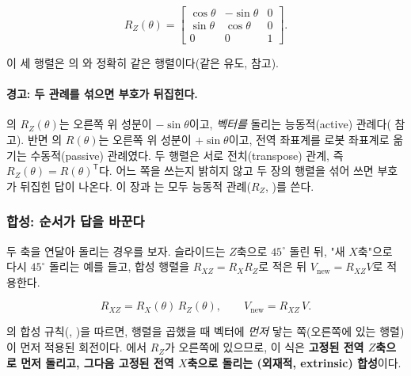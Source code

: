 \begin{equation}
\label{eq:lec02-rz}
R_Z(\theta) =
\begin{bmatrix}
\cos\theta & -\sin\theta & 0 \\
\sin\theta & \cos\theta & 0 \\
0 & 0 & 1
\end{bmatrix}.
\end{equation}

이 세 행렬은 의 와 정확히
같은 행렬이다(같은 유도,  참고).

\paragraph{경고: 두 관례를 섞으면 부호가 뒤집힌다.}
의 $R_Z(\theta)$는 오른쪽 위 성분이 $-\sin\theta$이고,
\emph{벡터를} 돌리는 능동적(active) 관례다( 참고).
반면 의 $R(\theta)$는 오른쪽 위 성분이 $+\sin\theta$이고, 전역
좌표계를 로봇 좌표계로 옮기는 수동적(passive) 관례였다. 두 행렬은 서로
전치(transpose) 관계, 즉 $R_Z(\theta) = R(\theta)^{\mathsf{T}}$다. 어느 쪽을
쓰는지 밝히지 않고 두 장의 행렬을 섞어 쓰면 부호가 뒤집힌 답이 나온다. 이
장과 는 모두 능동적 관례($R_Z$, )를 쓴다.

\subsubsection{합성: 순서가 답을 바꾼다}
\label{sec:lec02-rotation-compose}

두 축을 연달아 돌리는 경우를 보자. 슬라이드는 $Z$축으로 $45^\circ$ 돌린 뒤,
"새 $X$축"으로 다시 $45^\circ$ 돌리는 예를 들고, 합성 행렬을
$R_{XZ} = R_X R_Z$로 적은 뒤 $V_{\text{new}} = R_{XZ} V$로 적용한다.

\begin{equation}
\label{eq:lec02-rxz}
R_{XZ} = R_X(\theta)\,R_Z(\theta), \qquad V_{\text{new}} = R_{XZ}\,V.
\end{equation}

의 합성 규칙(, )을 따르면,
행렬을 곱했을 때 벡터에 \emph{먼저} 닿는 쪽(오른쪽에 있는 행렬)이 먼저 적용된
회전이다. 에서 $R_Z$가 오른쪽에 있으므로, 이 식은
\textbf{고정된 전역 $Z$축으로 먼저 돌리고, 그다음 고정된 전역 $X$축으로 돌리는
(외재적, extrinsic) 합성}이다.

